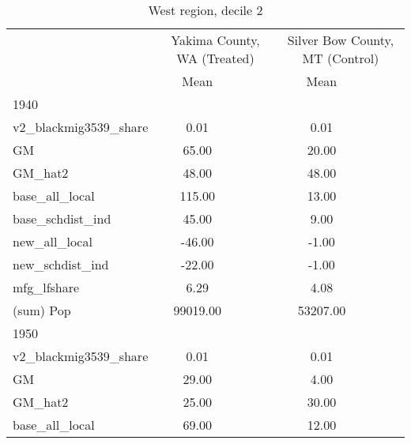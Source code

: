 \begin{table}[htbp]\centering
\def\sym#1{\ifmmode^{#1}\else\(^{#1}\)\fi}
\caption{West region, decile 2 \label{tab1}}
\begin{tabular}{l*{2}{ccc}}
\toprule
                    &\multicolumn{3}{c}{Yakima County, WA (Treated)}&\multicolumn{3}{c}{Silver Bow County, MT (Control)}\\
                    &        Mean&            &            &        Mean&            &            \\
\midrule
1940                &            &            &            &            &            &            \\
v2\_blackmig3539\_share&        0.01&            &            &        0.01&            &            \\
GM                  &       65.00&            &            &       20.00&            &            \\
GM\_hat2             &       48.00&            &            &       48.00&            &            \\
base\_all\_local      &      115.00&            &            &       13.00&            &            \\
base\_schdist\_ind    &       45.00&            &            &        9.00&            &            \\
new\_all\_local       &      -46.00&            &            &       -1.00&            &            \\
new\_schdist\_ind     &      -22.00&            &            &       -1.00&            &            \\
mfg\_lfshare         &        6.29&            &            &        4.08&            &            \\
(sum) Pop           &    99019.00&            &            &    53207.00&            &            \\
\midrule
1950                &            &            &            &            &            &            \\
v2\_blackmig3539\_share&        0.01&            &            &        0.01&            &            \\
GM                  &       29.00&            &            &        4.00&            &            \\
GM\_hat2             &       25.00&            &            &       30.00&            &            \\
base\_all\_local      &       69.00&            &            &       12.00&            &            \\

\end{tabular}
\end{table}
